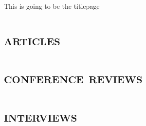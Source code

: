 \documentclass[%
greek,ngerman,italian,albanian,french,dutch,spanish,swedish,english,%
twoside=true,				%
open=right,					%
chapterprefix=false,		%
	headings=optiontohead, 		%
fontsize=11pt,				%
titlepage=on,				%
captions=tableabove,		%
numbers=noenddot,
]{scrbook}%
\begin{document}
	\begin{titlepage}
	
	This is going to be the titlepage
	\end{titlepage}	

\frontmatter 
\setcounter{secnumdepth}{0}
\setcounter{tocdepth}{0}
\tableofcontents





\mainmatter
\part{\scshape articles}






 



 


 




\part{\scshape conference reviews}





\part{\scshape interviews}


\end{document}

